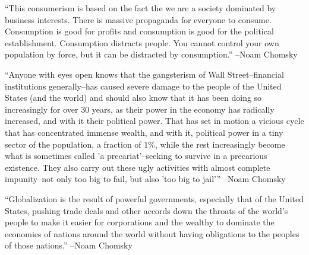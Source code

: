 \documentclass{article}%
\begin{document}
\linebreak%
\vspace{1mm}%
\begin{minipage}{\textwidth}%
\flushleft%
“This consumerism is based on the fact the we are a society dominated by business interests. There is massive propaganda for everyone to consume. Consumption is good for profits and consumption is good for the political establishment. Consumption distracts people. You cannot control your own population by force, but it can be distracted by consumption.”%
\linebreak%
\vspace{1mm}%
–Noam Chomsky%
\linebreak%
\vspace{1mm}%
\end{minipage}%
\linebreak%
\vspace{1mm}%
\begin{minipage}{\textwidth}%
\flushleft%
“Anyone with eyes open knows that the gangsterism of Wall Street–financial institutions generally–has caused severe damage to the people of the United States (and the world) and should also know that it has been doing so increasingly for over 30 years, as their power in the economy has radically increased, and with it their political power. That has set in motion a vicious cycle that has concentrated immense wealth, and with it, political power in a tiny sector of the population, a fraction of 1\%, while the rest increasingly become what is sometimes called ’a precariat’–seeking to survive in a precarious existence. They also carry out these ugly activities with almost complete impunity–not only too big to fail, but also ’too big to jail’”%
\linebreak%
\vspace{1mm}%
–Noam Chomsky%
\linebreak%
\vspace{1mm}%
\end{minipage}%
\linebreak%
\vspace{1mm}%
\begin{minipage}{\textwidth}%
\flushleft%
“Globalization is the result of powerful governments, especially that of the United States, pushing trade deals and other accords down the throats of the world's people to make it easier for corporations and the wealthy to dominate the economies of nations around the world without having obligations to the peoples of those nations.”%
\linebreak%
\vspace{1mm}%
–Noam Chomsky%
\linebreak%
\vspace{1mm}%
\end{minipage}%
\end{document}

